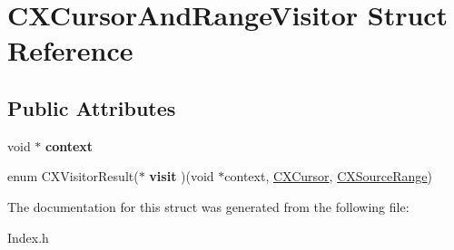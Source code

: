 \hypertarget{structCXCursorAndRangeVisitor}{}\section{C\+X\+Cursor\+And\+Range\+Visitor Struct Reference}
\label{structCXCursorAndRangeVisitor}
\subsection*{Public Attributes}
\begin{DoxyCompactItemize}
\item 
\mbox{\label{structCXCursorAndRangeVisitor_a77672740568fafe10dc17ac680c02b25}} 
void $\ast$ {\bfseries context}
\item 
\mbox{\label{structCXCursorAndRangeVisitor_a57a7d020d5f7aff64a0bdc237c8ae526}} 
enum C\+X\+Visitor\+Result($\ast$ {\bfseries visit} )(void $\ast$context, \mbox{\hyperlink{structCXCursor}{C\+X\+Cursor}}, \mbox{\hyperlink{structCXSourceRange}{C\+X\+Source\+Range}})
\end{DoxyCompactItemize}


The documentation for this struct was generated from the following file\+:\begin{DoxyCompactItemize}
\item 
Index.\+h\end{DoxyCompactItemize}
